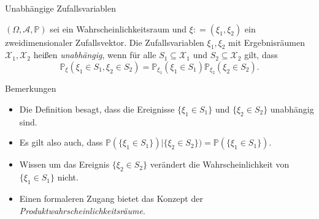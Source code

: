 \documentclass[
  8pt,
  ignorenonframetext,
]{beamer}
\providecommand{\tightlist}{%
  \setlength{\itemsep}{0pt}\setlength{\parskip}{0pt}}
\begin{document}
\begin{frame}{Unabhängige Zufallsvariablen}
\protect\hypertarget{unabhuxe4ngige-zufallsvariablen}{}
\small
\begin{definition}
\justifying
$(\Omega, \mathcal{A}, \mathbb{P})$ sei ein Wahrscheinlichkeitsraum und 
$\xi: = (\xi_1,\xi_2)$ ein zweidimensionaler Zufallsvektor. Die Zufallsvariablen 
$\xi_1,\xi_2$ mit Ergebnisräumen $\mathcal{X}_1, \mathcal{X}_2$ 
heißen \textit{unabhängig}, wenn für alle $S_1 \subseteq \mathcal{X}_1$ und 
$S_2 \subseteq \mathcal{X}_2$ gilt, dass
\begin{equation}
\mathbb{P}_\xi(\xi_1 \in S_1, \xi_2 \in S_2) =
\mathbb{P}_{\xi_1}(\xi_1 \in S_1)\mathbb{P}_{\xi_2}(\xi_2 \in S_2).
\end{equation}
\end{definition}

Bemerkungen

\begin{itemize}
\tightlist
\item
  Die Definition besagt, dass die Ereignisse \(\{\xi_1 \in S_1\}\) und
  \(\{\xi_2 \in S_2\}\) unabhängig sind.
\item
  Es gilt also auch, dass
  \(\mathbb{P}(\{\xi_1 \in S_1\})|\{\xi_2 \in S_2\}) = \mathbb{P}(\{\xi_1 \in S_1\})\).
\item
  Wissen um das Ereignis \(\{\xi_2 \in S_2\}\) verändert die
  Wahrscheinlichkeit von \(\{\xi_1 \in S_1\}\) nicht.
\item
  Einen formaleren Zugang bietet das Konzept der
  \textit{Produktwahrscheinlichkeitsräume}.
\end{itemize}
\end{frame}
\end{document}
